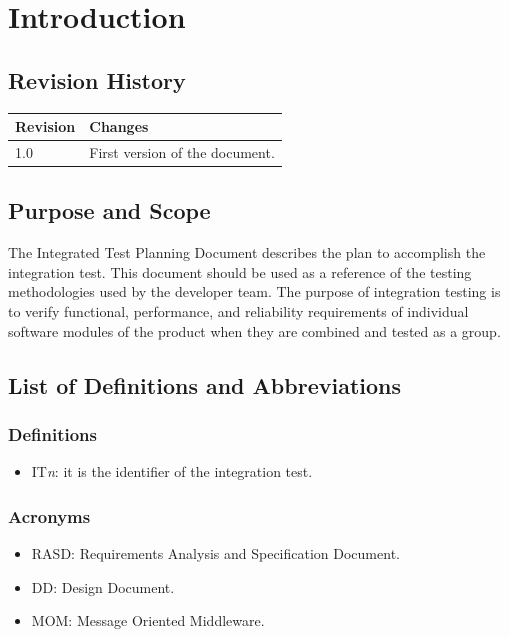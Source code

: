 \documentclass{article}
\begin{document}
	\newpage
	
	\section{Introduction}
		\subsection{Revision History}
			\begin{center}
				\renewcommand{\arraystretch}{1.4}
				\begin{tabular}{ | l | l |}
					\hline
					Revision & Changes\\ \hline
					1.0 & First version of the document.\\ \hline
				\end{tabular}
			\end{center}
		\subsection{Purpose and Scope}
			The Integrated Test Planning Document describes the plan to accomplish the integration test.
			This document should be used as a reference of the testing methodologies used by the developer team. The purpose of integration testing is to verify functional, performance, and reliability requirements of individual software modules of the product when they are combined and tested as a group.
		\subsection{List of Definitions and Abbreviations}
			\subsubsection{Definitions}
			\begin{itemize}
				\item IT\textit{n}: it is the identifier of the integration test.
			\end{itemize}
			\subsubsection{Acronyms}
			\begin{itemize}
				\item RASD: Requirements Analysis and Specification Document.
				\item DD: Design Document.
				\item MOM: Message Oriented Middleware.
			\end{itemize}
\end{document}
